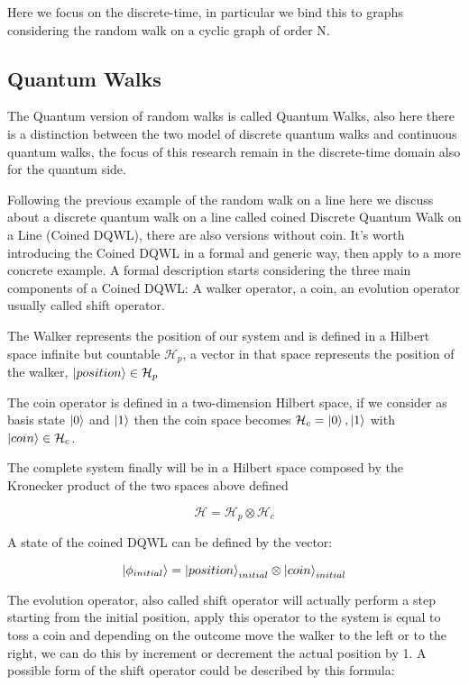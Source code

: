 Here we focus on the discrete-time, in particular we bind this to graphs considering the random walk on a cyclic graph of order N.

\subsection{Quantum Walks}

The Quantum version of random walks is called Quantum Walks, also here there is a distinction between the two model of discrete quantum walks and 
continuous quantum walks, the focus of this research remain in the discrete-time domain also for the quantum side. 

Following the previous example of the random walk on a line here we discuss about a discrete quantum walk on a line called coined Discrete Quantum Walk on a Line (Coined DQWL), there are also versions without coin. It's worth introducing
the Coined DQWL in a formal and generic way, then apply to a more concrete example. A formal description starts considering the three main components of a Coined DQWL: 
A walker operator, a coin, an evolution operator usually called shift operator. 

The Walker represents the position of our system and is defined in a Hilbert space infinite but countable $\mathcal{H}_{p}$, a vector in that space represents 
the position of the walker, $\ket{position} \in \mathcal{H}_{p}$ 

The coin operator is defined in a two-dimension Hilbert space, if we consider as basis state $\ket{0}$ and $\ket{1}$ then the coin space becomes
$\mathcal{H}_{c} = { \ket{0}, \ket{1} }$ with $\ket{coin} \in \mathcal{H}_{c}$.

The complete system finally will be in a Hilbert space composed by the Kronecker product of the two spaces above defined 

\begin{equation}
    \mathcal{H}=\mathcal{H}_{p}\otimes\mathcal{H}_{c}
\end{equation}

A state of the coined DQWL can be defined by the vector:

\begin{equation}
    \ket{\phi_{initial}} = \ket{position}_{initial} \otimes \ket{coin}_{initial}
\end{equation}

The evolution operator, also called shift operator will actually perform a step starting from the initial position, apply this operator to the
system is equal to toss a coin and depending on the outcome move the walker to the left or to the right, we can do this by increment or decrement
the actual position by 1. A possible form of the shift operator could be described by this formula:

